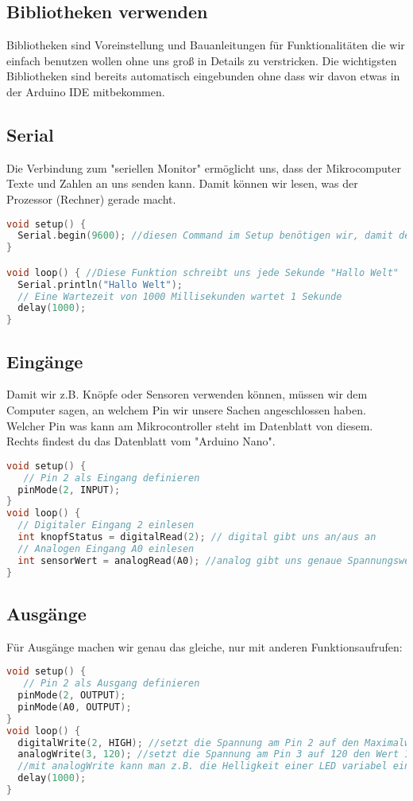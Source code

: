 \subsection{\large{Bibliotheken verwenden}}
Bibliotheken sind Voreinstellung und Bauanleitungen für Funktionalitäten die wir einfach benutzen wollen ohne uns groß in Details zu verstricken. Die wichtigsten Bibliotheken sind bereits automatisch eingebunden ohne dass wir davon etwas in der Arduino IDE mitbekommen.
\subsection{Serial}
Die Verbindung zum "seriellen Monitor" ermöglicht uns, dass der Mikrocomputer Texte und Zahlen an uns senden kann. Damit können wir lesen, was der Prozessor (Rechner) gerade macht. 
\begin{lstlisting}[language=c, caption=Ausgabe von Text an den Programmierer]
void setup() {
  Serial.begin(9600); //diesen Command im Setup benötigen wir, damit der Computer weiß, wie er mit uns reden soll
}

void loop() { //Diese Funktion schreibt uns jede Sekunde "Hallo Welt"
  Serial.println("Hallo Welt");
  // Eine Wartezeit von 1000 Millisekunden wartet 1 Sekunde    
  delay(1000);        
}
\end{lstlisting}
\newpage
\subsection{\large{Eingänge}}
Damit wir z.B. Knöpfe oder Sensoren verwenden können, müssen wir dem Computer sagen, an welchem Pin wir unsere Sachen angeschlossen haben. Welcher Pin was kann am Mikrocontroller steht im Datenblatt von diesem. Rechts findest du das Datenblatt vom "Arduino Nano".
\begin{lstlisting}[language=c, caption=Eingänge am Arduino lesen]
void setup() {
   // Pin 2 als Eingang definieren
  pinMode(2, INPUT); 
}
void loop() {
  // Digitaler Eingang 2 einlesen
  int knopfStatus = digitalRead(2); // digital gibt uns an/aus an
  // Analogen Eingang A0 einlesen
  int sensorWert = analogRead(A0); //analog gibt uns genaue Spannungswerte am jeweiligen Pin an
}
\end{lstlisting}
\hfill \break \hfill \break \hfill \break \hfill \break \hfill \break \hfill \break \hfill \break \hfill \break \hfill \break \hfill \break \hfill \break \hfill \break \hfill \break \hfill \break
\subsection{\large{Ausgänge}}
Für Ausgänge machen wir genau das gleiche, nur mit anderen Funktionsaufrufen:
\begin{lstlisting}[language=c, caption=Ausgänge am Arduino nutzen]
void setup() {
   // Pin 2 als Ausgang definieren
  pinMode(2, OUTPUT); 
  pinMode(A0, OUTPUT);
}
void loop() {
  digitalWrite(2, HIGH); //setzt die Spannung am Pin 2 auf den Maximalwert
  analogWrite(3, 120); //setzt die Spannung am Pin 3 auf 120 den Wert 120 (Maximal gehen 255)
  //mit analogWrite kann man z.B. die Helligkeit einer LED variabel einstellen, wenn die LED das erlaubt
  delay(1000);
}
\end{lstlisting}
